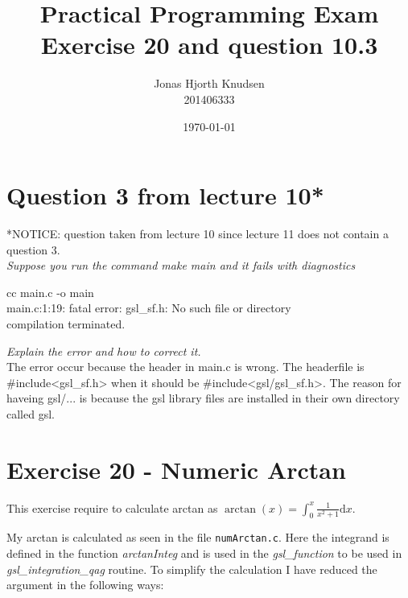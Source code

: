 \documentclass[a4paper,10pt,onecolumn]{article}
\begin{document}
\title{Practical Programming Exam\\ Exercise 20 and question 10.3}
\author{Jonas Hjorth Knudsen\\ 201406333}
\date{\today}

\maketitle



\section{Question 3 from lecture 10*}
*NOTICE: question taken from lecture 10 since lecture 11 does not contain a question 3.\\

\textit{Suppose you run the command \emph{make main} and it fails with diagnostics}

\begin{framed}
cc \hspace{1cm} main.c \hspace{1cm} -o main\\
main.c:1:19: fatal error: gsl\_sf.h: No such file or directory\\
compilation terminated.
\end{framed}

\textit{Explain the error and how to correct it.}\\

The error occur because the header in main.c is wrong. The headerfile is \mbox{\#include\textless gsl\_sf.h\textgreater}
 when it should be \#include\textless gsl/gsl\_sf.h\textgreater.
The reason for haveing gsl/... is because the gsl library files are installed in their own directory called gsl.




\section{Exercise 20 - Numeric Arctan}

This exercise require to calculate arctan as $\arctan(x) = \int_0^x \frac{1}{x^2+1} \mathrm{d}x$.

My arctan is calculated as seen in the file \texttt{numArctan.c}. Here the integrand is defined in the function \emph{arctanInteg} and is used
in the \emph{gsl\_function} to be used in \emph{gsl\_integration\_qag} routine. To simplify the calculation I have reduced the argument in the following ways:
\end{document}
